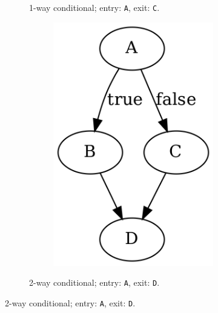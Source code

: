 \begin{savenotes}
\begin{figure}[htbp]
\begin{subfigure}[ht]{0.23\textwidth}
\begin{subfigure}[ht]{0.42\textwidth}
			\end{subfigure}
			\caption{1-way conditional; entry: \texttt{A}, exit: \texttt{C}.}
			\label{fig:if_graph_representation}
		\end{subfigure}
		\qquad
		\begin{subfigure}[ht]{0.28\textwidth}
			\centering
			\begin{subfigure}[ht]{0.45\textwidth}
				
			\end{subfigure}
			\begin{subfigure}[ht]{0.50\textwidth}
				\includegraphics[width=\textwidth]{inc/primitives/if_else.png}
			\end{subfigure}
			\caption{2-way conditional; entry: \texttt{A}, exit: \texttt{D}.}

\end{subfigure}
\end{figure}
\end{savenotes}
